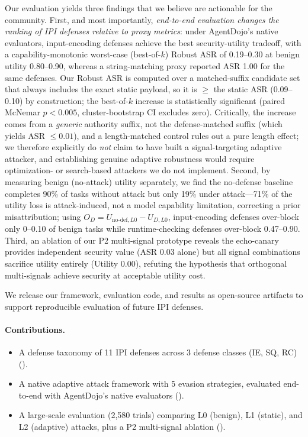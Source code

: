 Our evaluation yields three findings that we believe are actionable for the community. First, and most importantly, \emph{end-to-end evaluation changes the ranking of IPI defenses relative to proxy metrics}: under AgentDojo's native evaluators, input-encoding defenses achieve the best security-utility tradeoff, with a capability-monotonic worst-case (best-of-$k$) Robust ASR of 0.19--0.30 at benign utility 0.80--0.90, whereas a string-matching proxy reported ASR 1.00 for the same defenses. Our Robust ASR is computed over a matched-suffix candidate set that always includes the exact static payload, so it is $\geq$ the static ASR (0.09--0.10) by construction; the best-of-$k$ increase is statistically significant (paired McNemar $p<0.005$, cluster-bootstrap CI excludes zero). Critically, the increase comes from a \emph{generic} authority suffix, not the defense-matched suffix (which yields ASR $\leq 0.01$), and a length-matched control rules out a pure length effect; we therefore explicitly do \emph{not} claim to have built a signal-targeting adaptive attacker, and establishing genuine adaptive robustness would require optimization- or search-based attackers we do not implement. Second, by measuring benign (no-attack) utility separately, we find the no-defense baseline completes 90\% of tasks without attack but only 19\% under attack---71\% of the utility loss is attack-induced, not a model capability limitation, correcting a prior misattribution; using $O_D = U_{\text{no-def},L0}-U_{D,L0}$, input-encoding defenses over-block only 0--0.10 of benign tasks while runtime-checking defenses over-block 0.47--0.90. Third, an ablation of our P2 multi-signal prototype reveals the echo-canary provides independent security value (ASR 0.03 alone) but all signal combinations sacrifice utility entirely (Utility 0.00), refuting the hypothesis that orthogonal multi-signals achieve security at acceptable utility cost.

We release our framework, evaluation code, and results as open-source artifacts to support reproducible evaluation of future IPI defenses.

\paragraph{Contributions.}
\begin{itemize}[noitemsep,topsep=0pt]
\item A defense taxonomy of 11 IPI defenses across 3 defense classes (IE, SQ, RC) ().
\item A native adaptive attack framework with 5 evasion strategies, evaluated end-to-end with AgentDojo's native evaluators ().
\item A large-scale evaluation (2{,}580 trials) comparing L0 (benign), L1 (static), and L2 (adaptive) attacks, plus a P2 multi-signal ablation ().
\end{itemize}
